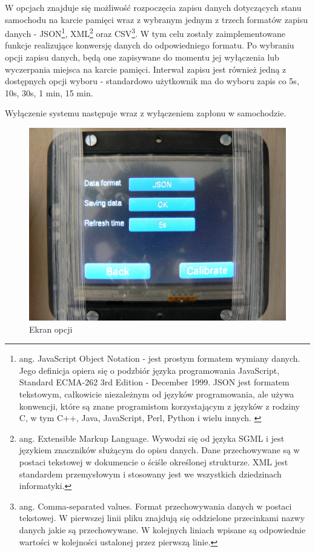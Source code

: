 \documentclass{xmgr}
\begin{document}
W opcjach znajduje się możliwość rozpoczęcia zapisu danych dotyczących stanu samochodu na karcie pamięci wraz z wybranym jednym z trzech formatów zapisu danych - JSON\footnote{ang. JavaScript Object Notation - jest prostym formatem wymiany danych. Jego definicja opiera się o podzbiór języka programowania JavaScript, Standard ECMA-262 3rd Edition - December 1999. JSON jest formatem tekstowym, całkowicie niezależnym od języków programowania, ale używa konwencji, które są znane programistom korzystającym z języków z rodziny C, w tym C++, Java, JavaScript, Perl, Python i wielu innych. \cite{JSON}}, XML\footnote{ang. Extensible Markup Language. Wywodzi się od języka SGML i jest językiem znaczników służącym do opisu danych. Dane przechowywane są w postaci tekstowej w dokumencie o ściśle określonej strukturze. XML jest standardem przemysłowym i stosowany jest we wszystkich dziedzinach informatyki.\cite{XML}} oraz CSV\footnote{ang. Comma-separated values. Format przechowywania danych w postaci tekstowej. W pierwszej linii pliku znajdują się oddzielone przecinkami nazwy danych jakie są przechowywane. W kolejnych liniach wpisane są odpowiednie wartości w kolejności ustalonej przez pierwszą linie.}. W tym celu zostały zaimplementowane funkcje realizujące konwersję danych do odpowiedniego formatu. Po wybraniu opcji zapisu danych, będą one zapisywane do momentu jej wyłączenia lub wyczerpania miejsca na karcie pamięci. Interwał zapisu jest również jedną z dostępnych opcji wyboru - standardowo użytkownik ma do wyboru zapis co 5s, 10s, 30s, 1 min, 15 min.

Wyłączenie systemu następuje wraz z wyłączeniem zapłonu w samochodzie. 

\begin{figure}[!h]
    \centering
    	\includegraphics[height=0.4\textheight]{images/opcje.JPG}
    \caption{Ekran opcji}
\end{figure}
\end{document}
